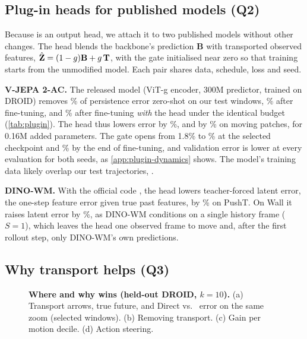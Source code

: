 \subsection{Plug-in heads for published models (Q2)}
\label{sec:plugin}

Because \ours{} is an output head, we attach it to two published models without other changes.
%
The head blends the backbone's prediction $\mathbf{B}$ with transported observed features,
$\hat{\mathbf{Z}}=(1-g)\mathbf{B}+g\,\mathbf{T}$, with the gate initialised near zero so that training starts from the
unmodified model.
%
Each pair shares data, schedule, loss and seed.

\textbf{V-JEPA 2-AC.} The released model \citep{assran2025vjepa2} (ViT-g encoder, 300M predictor, trained on DROID)
removes \vjepaSkillZS\% of persistence error zero-shot on our test windows, \vjepaSkillFT\% after fine-tuning, and
\vjepaSkillOurs\% after fine-tuning \emph{with} the head under the identical budget (\cref{tab:plugin}).
%
The head thus lowers error by \vjepaMSERed\%, and by \vjepaMovingRed\% on moving patches, for 0.16M added
parameters.
%
The gate opens from 1.8\% to \vjepaGateTest\% at the selected checkpoint and \vjepaGateEnd\% by the end of fine-tuning,
and validation error is lower at every evaluation for both seeds, as \cref{app:plugin-dynamics} shows.
%
The model's training data likely overlap our test trajectories, .

\textbf{DINO-WM.} With the official code \citep{zhou2025dinowm}, the head lowers teacher-forced latent error, the one-step feature error given true
past features, by
\dinowmPushtErrRed\% on PushT.
%
On Wall it raises latent error by \dinowmWallErrInc\%, as DINO-WM conditions on a single history frame ($S{=}1$), which
leaves the head one observed frame to move and, after the first rollout step, only DINO-WM's own predictions.

\subsection{Why transport helps (Q3)}
\label{sec:analysis}
\begin{figure}[t]
  \centering
  \caption{\textbf{Where and why \ours{} wins (held-out DROID, $k{=}10$).} (a) Transport arrows, true future, and Direct vs.\ \ours{} error on the same zoom (selected windows). (b) Removing transport. (c) Gain per motion decile. (d) Action steering.}
  \label{fig:qualitative}
\end{figure}
